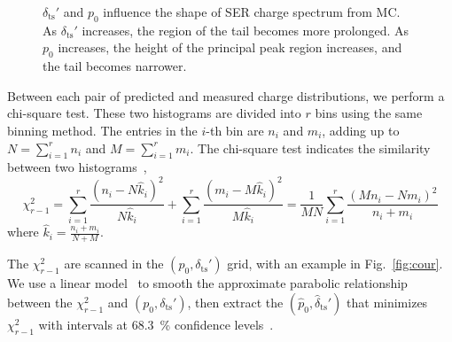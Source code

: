 \begin{figure}[!htbp]
\begin{subfigure}{0.47\textwidth}
		\caption{}
		\label{fig:ts}
	\end{subfigure}
	\caption{$\delta_{\mathrm{ts}}'$ and $p_0$ influence the shape of SER charge spectrum from MC.
		As $\delta_{\mathrm{ts}}'$ increases, the region of the tail becomes more prolonged.
		As $p_0$ increases, the height of the principal peak region increases, and the tail becomes narrower.
	}
	\label{fig:tsp}
\end{figure}

Between each pair of predicted and measured charge distributions, we perform a chi-square test.
These two histograms are divided into $r$ bins using the same binning method.
The entries in the \(i\)-th bin are $n_i$ and $m_{i}$, adding up to
$N = \sum_{{i}=1}^{r}n_{i}$ and $M = \sum_{{i}=1}^{r}m_{i}$.
The chi-square test indicates the similarity between two histograms~\cite{2006Comparison},
\begin{equation}
	\label{eq:chi}
	\chi^2_{r-1}=\sum_{{i}=1}^r \frac{\left(n_{i}-N \hat{k}_{i}\right)^2}{N \hat{k}_{i}}+\sum_{{i}=1}^r
	\frac{\left(m_{i}-M \hat{k}_{i}\right)^2}{M \hat{k}_{i}}=\frac{1}{M N} \sum_{{i}=1}^r
	\frac{\left(M n_{i}-N m_{i}\right)^2}{n_{i}+m_{i}}
\end{equation}
where \(\hat{k}_{i}=\frac{n_{i}+m_{i}}{N+M}\).

The \(\chi^2_{r-1}\) are scanned in the $(p_0,\delta_{\mathrm{ts}}')$ grid, with an example in Fig.~\ref{fig:cour}.
We use a linear model~\cite{Gelman_Hill_2006} to smooth the approximate parabolic relationship
between the \(\chi^2_{r-1}\) and $(p_0, \delta_{\mathrm{ts}}')$,
then extract the $(\hat{p}_0, \hat{\delta}_{\mathrm{ts}}')$ that minimizes \(\chi^2_{r-1}\) with
intervals at \SI{68.3}{\percent} confidence levels~\cite{cowan1997statistical}.

